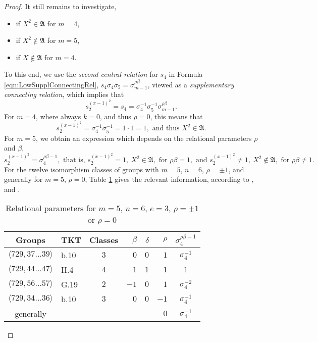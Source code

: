 \documentclass{amsart}
\theoremstyle{definition}
\numberwithin{equation}{section}
\begin{document}
\begin{proof}
It still remains to investigate,

\begin{itemize}
\item
if \(X^2\in\mathfrak{A}\) for \(m=4\),
\item
if \(X^2\not\in\mathfrak{A}\) for \(m=5\),
\item
if \(X\not\in\mathfrak{A}\) for \(m=4\).
\end{itemize}

\noindent
To this end, we use the \textit{second central relation} for \(s_4\) in Formula
\eqref{eqn:LowSupplConnectingRel},
\(s_4\sigma_4\sigma_5=\sigma_{m-1}^{\rho\beta}\),
viewed as a \textit{supplementary connecting relation},
which implies that
\[s_2^{(x-1)^2}=s_4=\sigma_4^{-1}\sigma_5^{-1}\sigma_{m-1}^{\rho\beta}.\]
For \(m=4\), where always \(k=0\), and thus \(\rho=0\),
this means that
\[s_2^{(x-1)^2}=\sigma_4^{-1}\sigma_5^{-1}=1\cdot 1=1, \text{ and thus } X^2\in\mathfrak{A}.\]
For \(m=5\), we obtain an expression which depends on the relational parameters \(\rho\) and \(\beta\),
\[s_2^{(x-1)^2}=\sigma_4^{\rho\beta-1}, \text{ that is, }
s_2^{(x-1)^2}=1,\ X^2\in\mathfrak{A}, \text{ for } \rho\beta=1, \text{ and }
s_2^{(x-1)^2}\ne 1,\ X^2\not\in\mathfrak{A}, \text{ for } \rho\beta\ne 1.\]
For the twelve isomorphism classes of groups with \(m=5\), \(n=6\), \(\rho=\pm 1\),
and generally for \(m=5\), \(\rho=0\), Table
\ref{tbl:SmlCycExpX}
gives the relevant information, according to
\cite[p. 4--7]{Ne2},
and
\cite{BEO2}.

\begin{table}[ht]
\caption{Relational parameters for \(m=5\), \(n=6\), \(e=3\), \(\rho=\pm 1\) or \(\rho=0\)}
\label{tbl:SmlCycExpX}
\begin{center}
\begin{tabular}{|c|l|c|rrr|c|}
\hline
 Groups                             & TKT  & Classes & \(\beta\) & \(\delta\) & \(\rho\) & \(\sigma_4^{\rho\beta-1}\) \\
\hline
 \(\langle 729,37\ldots 39\rangle\) & b.10 &   \(3\) &     \(0\) &      \(0\) &    \(1\) &          \(\sigma_4^{-1}\) \\
 \(\langle 729,44\ldots 47\rangle\) & H.4  &   \(4\) &     \(1\) &      \(1\) &    \(1\) &                      \(1\) \\
 \(\langle 729,56\ldots 57\rangle\) & G.19 &   \(2\) &    \(-1\) &      \(0\) &    \(1\) &          \(\sigma_4^{-2}\) \\
 \(\langle 729,34\ldots 36\rangle\) & b.10 &   \(3\) &     \(0\) &      \(0\) &   \(-1\) &          \(\sigma_4^{-1}\) \\
\hline
 generally                          &      &         &           &            &    \(0\) &          \(\sigma_4^{-1}\) \\
\hline
\end{tabular}
\end{center}
\end{table}


\end{proof}
\end{document}

